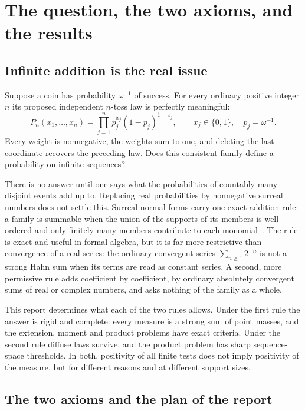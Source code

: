 \documentclass[11pt]{article}
\numberwithin{equation}{section}
\theoremstyle{definition}
\theoremstyle{remark}
\begin{document}
\section{The question, the two axioms, and the results}\label{meas:sec:intro}

\subsection{Infinite addition is the real issue}\label{meas:sub:question}

Suppose a coin has probability $\omega^{-1}$ of success. For every ordinary
positive integer $n$ its proposed independent $n$-toss law is perfectly
meaningful:
\begin{equation}\label{meas:eq:finite-intro}
 P_n(x_1,\ldots,x_n)=\prod_{j=1}^n p_j^{x_j}(1-p_j)^{1-x_j},
 \qquad x_j\in\{0,1\},\quad p_j=\omega^{-1}.
\end{equation}
Every weight is nonnegative, the weights sum to one, and deleting the last
coordinate recovers the preceding law. Does this consistent family define a
probability on infinite sequences?

There is no answer until one says what the probabilities of countably many
disjoint events add up to. Replacing real probabilities by nonnegative
surreal numbers does not settle this. Surreal normal forms carry one exact
addition rule: a family is summable when the union of the supports of its
members is well ordered and only finitely many members contribute to each
monomial~\cite{repofound}. The rule is exact and useful in formal algebra, but
it is far more restrictive than convergence of a real series: the ordinary
convergent series $\sum_{n\ge1}2^{-n}$ is not a strong Hahn sum when its
terms are read as constant series. A second, more permissive rule adds
coefficient by coefficient, by ordinary absolutely convergent sums of real or
complex numbers, and asks nothing of the family as a whole.

This report determines what each of the two rules allows. Under the first
rule the answer is rigid and complete: every measure is a strong sum of point
masses, and the extension, moment and product problems have exact
criteria. Under the second rule diffuse laws survive, and the product problem
has sharp sequence-space thresholds. In both, positivity of all finite tests
does not imply positivity of the measure, but for different reasons and at
different support sizes.

\subsection{The two axioms and the plan of the report}\label{meas:sub:plan}
\end{document}
